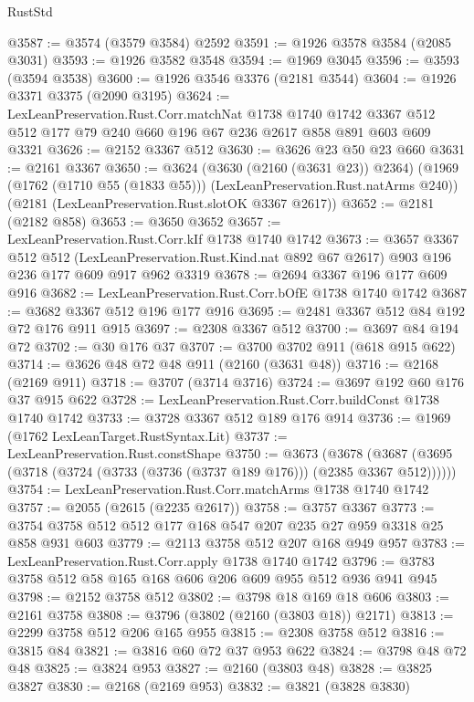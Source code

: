 \begin{lexlean}{RustStd}
\begin{coremodule}
@3587 := @3574 (@3579 @3584) @2592
@3591 := @1926 @3578 @3584 (@2085 @3031)
@3593 := @1926 @3582 @3548
@3594 := @1969 @3045
@3596 := @3593 (@3594 @3538)
@3600 := @1926 @3546 @3376 (@2181 @3544)
@3604 := @1926 @3371 @3375 (@2090 @3195)
@3624 := LexLeanPreservation.Rust.Corr.matchNat
    @1738
    @1740
    @1742
    @3367
    @512
    @512
    @177
    @79
    @240
    @660
    @196
    @67
    @236
    @2617
    @858
    @891
    @603
    @609
    @3321
@3626 := @2152 @3367 @512
@3630 := @3626 @23 @50 @23 @660
@3631 := @2161 @3367
@3650 := @3624
    (@3630 (@2160 (@3631 @23)) @2364)
    (@1969 (@1762 (@1710 @55 (@1833 @55))) (LexLeanPreservation.Rust.natArms @240))
    (@2181 (LexLeanPreservation.Rust.slotOK @3367 @2617))
@3652 := @2181 (@2182 @858)
@3653 := @3650 @3652
@3657 := LexLeanPreservation.Rust.Corr.kIf @1738 @1740 @1742
@3673 := @3657
    @3367
    @512
    @512
    (LexLeanPreservation.Rust.Kind.nat @892 @67 @2617)
    @903
    @196
    @236
    @177
    @609
    @917
    @962
    @3319
@3678 := @2694 @3367 @196 @177 @609 @916
@3682 := LexLeanPreservation.Rust.Corr.bOfE @1738 @1740 @1742
@3687 := @3682 @3367 @512 @196 @177 @916
@3695 := @2481 @3367 @512 @84 @192 @72 @176 @911 @915
@3697 := @2308 @3367 @512
@3700 := @3697 @84 @194 @72
@3702 := @30 @176 @37
@3707 := @3700 @3702 @911 (@618 @915 @622)
@3714 := @3626 @48 @72 @48 @911 (@2160 (@3631 @48))
@3716 := @2168 (@2169 @911)
@3718 := @3707 (@3714 @3716)
@3724 := @3697 @192 @60 @176 @37 @915 @622
@3728 := LexLeanPreservation.Rust.Corr.buildConst @1738 @1740 @1742
@3733 := @3728 @3367 @512 @189 @176 @914
@3736 := @1969 (@1762 LexLeanTarget.RustSyntax.Lit)
@3737 := LexLeanPreservation.Rust.constShape
@3750 := @3673
    (@3678 (@3687 (@3695 (@3718 (@3724 (@3733 (@3736 (@3737 @189 @176))) (@2385 @3367 @512))))))
@3754 := LexLeanPreservation.Rust.Corr.matchArms @1738 @1740 @1742
@3757 := @2055 (@2615 (@2235 @2617))
@3758 := @3757 @3367
@3773 := @3754 @3758 @512 @512 @177 @168 @547 @207 @235 @27 @959 @3318 @25 @858 @931 @603
@3779 := @2113 @3758 @512 @207 @168 @949 @957
@3783 := LexLeanPreservation.Rust.Corr.apply @1738 @1740 @1742
@3796 := @3783 @3758 @512 @58 @165 @168 @606 @206 @609 @955 @512 @936 @941 @945
@3798 := @2152 @3758 @512
@3802 := @3798 @18 @169 @18 @606
@3803 := @2161 @3758
@3808 := @3796 (@3802 (@2160 (@3803 @18)) @2171)
@3813 := @2299 @3758 @512 @206 @165 @955
@3815 := @2308 @3758 @512
@3816 := @3815 @84
@3821 := @3816 @60 @72 @37 @953 @622
@3824 := @3798 @48 @72 @48
@3825 := @3824 @953
@3827 := @2160 (@3803 @48)
@3828 := @3825 @3827
@3830 := @2168 (@2169 @953)
@3832 := @3821 (@3828 @3830)

\end{coremodule}
\end{lexlean}
